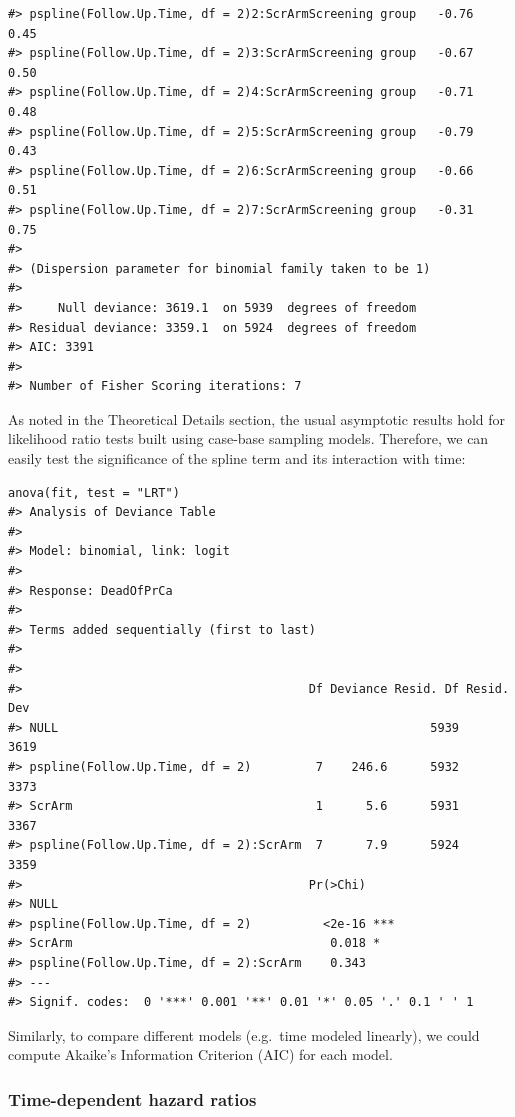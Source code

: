 \begin{verbatim}
#> pspline(Follow.Up.Time, df = 2)2:ScrArmScreening group   -0.76     0.45
#> pspline(Follow.Up.Time, df = 2)3:ScrArmScreening group   -0.67     0.50
#> pspline(Follow.Up.Time, df = 2)4:ScrArmScreening group   -0.71     0.48
#> pspline(Follow.Up.Time, df = 2)5:ScrArmScreening group   -0.79     0.43
#> pspline(Follow.Up.Time, df = 2)6:ScrArmScreening group   -0.66     0.51
#> pspline(Follow.Up.Time, df = 2)7:ScrArmScreening group   -0.31     0.75
#> 
#> (Dispersion parameter for binomial family taken to be 1)
#> 
#>     Null deviance: 3619.1  on 5939  degrees of freedom
#> Residual deviance: 3359.1  on 5924  degrees of freedom
#> AIC: 3391
#> 
#> Number of Fisher Scoring iterations: 7
\end{verbatim}

As noted in the Theoretical Details section, the usual asymptotic results hold
for likelihood ratio tests built using case-base sampling models. Therefore, we
can easily test the significance of the spline term and its interaction with time:

\begin{verbatim}
anova(fit, test = "LRT")
#> Analysis of Deviance Table
#> 
#> Model: binomial, link: logit
#> 
#> Response: DeadOfPrCa
#> 
#> Terms added sequentially (first to last)
#> 
#> 
#>                                        Df Deviance Resid. Df Resid. Dev
#> NULL                                                    5939       3619
#> pspline(Follow.Up.Time, df = 2)         7    246.6      5932       3373
#> ScrArm                                  1      5.6      5931       3367
#> pspline(Follow.Up.Time, df = 2):ScrArm  7      7.9      5924       3359
#>                                        Pr(>Chi)    
#> NULL                                               
#> pspline(Follow.Up.Time, df = 2)          <2e-16 ***
#> ScrArm                                    0.018 *  
#> pspline(Follow.Up.Time, df = 2):ScrArm    0.343    
#> ---
#> Signif. codes:  0 '***' 0.001 '**' 0.01 '*' 0.05 '.' 0.1 ' ' 1
\end{verbatim}

Similarly, to compare different models (e.g.~time modeled linearly), we could
compute Akaike's Information Criterion (AIC) for each model.

\hypertarget{time-dependent-hazard-ratios}{%
\subsubsection{Time-dependent hazard ratios}\label{time-dependent-hazard-ratios}}

